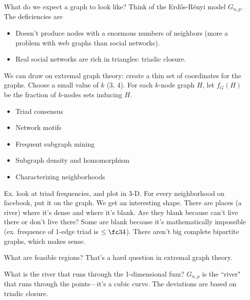 What do we expect a graph to look like? Think of the Erd\H os-R\'enyi model $G_{n,p}$. The deficiencies are
\begin{itemize}
\item
Doesn't produce nodes with a enormous numbers of neighbors (more a problem with web graphs than social networks).
\item
Real social networks are rich in triangles: triadic closure.
\end{itemize}
We can draw on extremal graph theory: create a thin set of coordinates for the graphs. Choose a small value of $k$ (3, 4). For each $k$-node graph $H$, let $f_G(H)$ be the fraction of $k$-nodes sets inducing $H$.
\begin{itemize}
\item
Triad consensus
\item
Network motifs
\item
Frequent subgraph mining
\item
Subgraph density and homomorphism
\item
Characterizing neighborhoods
\end{itemize}
Ex. look at triad frequencies, and plot in 3-D. For every neighborhood on facebook, put it on the graph. We get an interesting shape. There are places (a river) where it's dense and where it's blank. Are they blank because can't live there or don't live there? Some are blank because it's mathematically impossible (ex. frequence of 1-edge triad is $\le \fc 34$). 
There aren't big complete bipartite graphs, which makes sense.

What are feasible regions? That's a hard question in extremal graph theory.

What is the river that runs through the 1-dimensional fuzz? $G_{n,p}$ is the ``river" that runs through the points---it's a cubic curve. The deviations are based on triadic closure.

